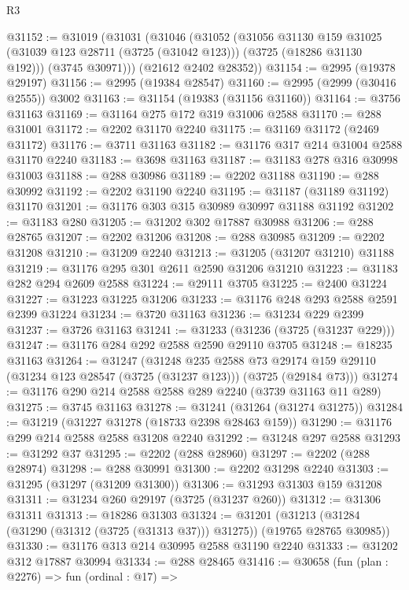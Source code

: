 \begin{lexlean}{R3}
\begin{coremodule}
@31152 := @31019
    (@31031
      (@31046
        (@31052
          (@31056
            @31130
            @159
            @31025
            (@31039 @123 @28711 (@3725 (@31042 @123)))
            (@3725 (@18286 @31130 @192)))
          (@3745 @30971)))
      (@21612 @2402 @28352))
@31154 := @2995 (@19378 @29197)
@31156 := @2995 (@19384 @28547)
@31160 := @2995 (@2999 (@30416 @2555)) @3002
@31163 := @31154 (@19383 (@31156 @31160))
@31164 := @3756 @31163
@31169 := @31164 @275 @172 @319 @31006 @2588
@31170 := @288 @31001
@31172 := @2202 @31170 @2240
@31175 := @31169 @31172 (@2469 @31172)
@31176 := @3711 @31163
@31182 := @31176 @317 @214 @31004 @2588 @31170 @2240
@31183 := @3698 @31163
@31187 := @31183 @278 @316 @30998 @31003
@31188 := @288 @30986
@31189 := @2202 @31188
@31190 := @288 @30992
@31192 := @2202 @31190 @2240
@31195 := @31187 (@31189 @31192) @31170
@31201 := @31176 @303 @315 @30989 @30997 @31188 @31192
@31202 := @31183 @280
@31205 := @31202 @302 @17887 @30988
@31206 := @288 @28765
@31207 := @2202 @31206
@31208 := @288 @30985
@31209 := @2202 @31208
@31210 := @31209 @2240
@31213 := @31205 (@31207 @31210) @31188
@31219 := @31176 @295 @301 @2611 @2590 @31206 @31210
@31223 := @31183 @282 @294 @2609 @2588
@31224 := @29111 @3705
@31225 := @2400 @31224
@31227 := @31223 @31225 @31206
@31233 := @31176 @248 @293 @2588 @2591 @2399 @31224
@31234 := @3720 @31163
@31236 := @31234 @229 @2399
@31237 := @3726 @31163
@31241 := @31233 (@31236 (@3725 (@31237 @229)))
@31247 := @31176 @284 @292 @2588 @2590 @29110 @3705
@31248 := @18235 @31163
@31264 := @31247
    (@31248
      @235
      @2588
      @73
      @29174
      @159
      @29110
      (@31234 @123 @28547 (@3725 (@31237 @123)))
      (@3725 (@29184 @73)))
@31274 := @31176 @290 @214 @2588 @2588 @289 @2240 (@3739 @31163 @11 @289)
@31275 := @3745 @31163
@31278 := @31241 (@31264 (@31274 @31275))
@31284 := @31219 (@31227 @31278 (@18733 @2398 @28463 @159))
@31290 := @31176 @299 @214 @2588 @2588 @31208 @2240
@31292 := @31248 @297 @2588
@31293 := @31292 @37
@31295 := @2202 (@288 @28960)
@31297 := @2202 (@288 @28974)
@31298 := @288 @30991
@31300 := @2202 @31298 @2240
@31303 := @31295 (@31297 (@31209 @31300))
@31306 := @31293 @31303 @159 @31208
@31311 := @31234 @260 @29197 (@3725 (@31237 @260))
@31312 := @31306 @31311
@31313 := @18286 @31303
@31324 := @31201
    (@31213 (@31284 (@31290 (@31312 (@3725 (@31313 @37))) @31275)) (@19765 @28765 @30985))
@31330 := @31176 @313 @214 @30995 @2588 @31190 @2240
@31333 := @31202 @312 @17887 @30994
@31334 := @288 @28465
@31416 := @30658
    (fun (plan : @2276) =>
    fun (ordinal : @17) =>

\end{coremodule}
\end{lexlean}

